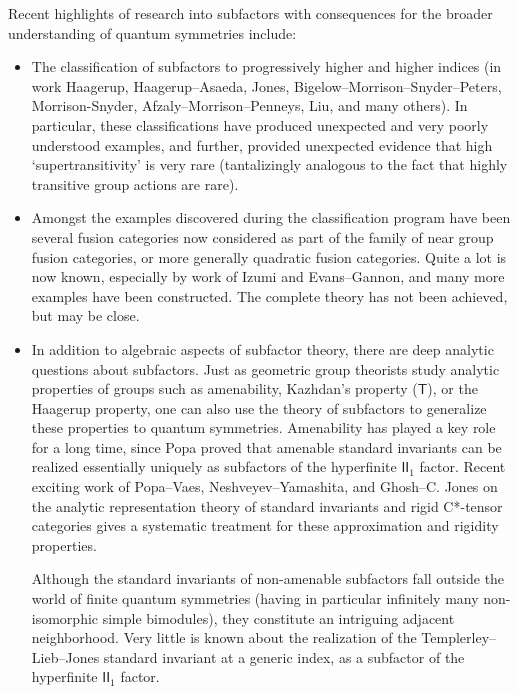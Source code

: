 \documentclass[12pt]{article}
\begin{document}
Recent highlights of research into subfactors with consequences for the broader understanding of quantum symmetries include:
\begin{itemize}
  \setlength{\itemsep}{1pt}
  \setlength{\parskip}{0pt}
  \setlength{\parsep}{0pt}
\item The classification of subfactors to progressively higher and higher indices (in work Haagerup, Haagerup--Asaeda, Jones, Bigelow--Morrison--Snyder--Peters, Morrison-Snyder, Afzaly--Morrison--Penneys, Liu, and many others). In particular, these classifications have produced unexpected and very poorly understood examples, and further, provided unexpected evidence that high `supertransitivity' is very rare (tantalizingly analogous to the fact that highly transitive group actions are rare).
\item Amongst the examples discovered during the classification program have been several fusion categories now considered as part of the family of near group fusion categories, or more generally quadratic fusion categories. Quite a lot is now known, especially by work of Izumi and Evans--Gannon, and many more examples have been constructed. The complete theory has not been achieved, but may be close.

\item In addition to algebraic aspects of subfactor theory, there are deep analytic questions about subfactors. Just as geometric group theorists study analytic properties of groups such as amenability, Kazhdan's property ($\mathsf{T}$), or the Haagerup property, one can also use the theory of subfactors to generalize these properties to quantum symmetries. Amenability has played a key role for a long time, since Popa proved that amenable standard invariants can be realized essentially uniquely as subfactors of the hyperfinite $\mathsf{II}_1$ factor.
Recent exciting work of Popa--Vaes, Neshveyev--Yamashita, and Ghosh--C. Jones on the analytic representation theory of standard
invariants and rigid C*-tensor categories gives a systematic treatment
for these approximation and rigidity properties.

Although the standard invariants of non-amenable subfactors fall outside the world of finite quantum symmetries (having in particular infinitely many non-isomorphic simple bimodules), they constitute an intriguing adjacent neighborhood. Very little is known about the realization of the Templerley--Lieb--Jones standard invariant at a generic index, as a subfactor  of the hyperfinite $\mathsf{II}_1$ factor. 


\end{itemize}
\end{document}
